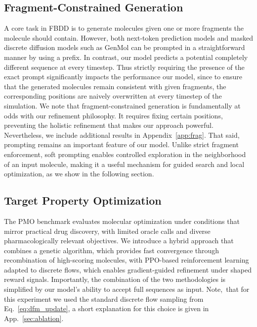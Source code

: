 \documentclass{article} %
\begin{document}
\subsection{Fragment-Constrained Generation}\label{sec:frag_const}
A core task in FBDD is to generate molecules given one or more fragments the molecule should contain.
However, both next-token prediction models and masked discrete diffusion models such as GenMol can be prompted in a straightforward manner by using a prefix. In contrast, our model predicts a potential completely different sequence at every timestep. Thus strictly requiring the presence of the exact prompt significantly impacts the performance our model, since to ensure that the generated molecules remain consistent with given fragments, the corresponding positions are naively overwritten at every timestep of the simulation. We note that fragment-constrained generation is fundamentally at odds with our refinement philosophy. It requires fixing certain positions, preventing the holistic refinement that makes our approach powerful. Nevertheless, we include additional results in Appendix~\ref{app:frag}. That said, prompting remains an important feature of our model. Unlike strict fragment enforcement, soft prompting enables controlled exploration in the neighborhood of an input molecule, making it a useful mechanism for guided search and local optimization, as we show in the following section.



\subsection{Target Property Optimization}\label{sec:target}
The PMO benchmark evaluates molecular optimization under conditions that mirror practical drug discovery, with limited oracle calls and diverse pharmacologically relevant objectives. We introduce a hybrid approach that combines a genetic algorithm, which provides fast convergence through recombination of high-scoring molecules, with PPO-based reinforcement learning adapted to discrete flows, which enables gradient-guided refinement under shaped reward signals. Importantly, the combination of the two methodologies is simplified by our model’s ability to accept full sequences as input. Note,\ that for this experiment we used the standard discrete flow sampling from Eq.~\ref{eq:dfm_update}, a short explanation for this choice is given in App.~\ref{sec:ablation}.
\end{document}

